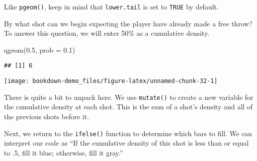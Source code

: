 \documentclass[
]{book}
\newenvironment{Shaded}{\begin{snugshade}}{\end{snugshade}}
\newcommand{\AttributeTok}[1]{\textcolor[rgb]{0.77,0.63,0.00}{#1}}
\newcommand{\DecValTok}[1]{\textcolor[rgb]{0.00,0.00,0.81}{#1}}
\newcommand{\FloatTok}[1]{\textcolor[rgb]{0.00,0.00,0.81}{#1}}
\newcommand{\FunctionTok}[1]{\textcolor[rgb]{0.00,0.00,0.00}{#1}}
\newcommand{\NormalTok}[1]{#1}
\newcommand{\OtherTok}[1]{\textcolor[rgb]{0.56,0.35,0.01}{#1}}
\newcommand{\SpecialCharTok}[1]{\textcolor[rgb]{0.00,0.00,0.00}{#1}}
\newcommand{\StringTok}[1]{\textcolor[rgb]{0.31,0.60,0.02}{#1}}
\begin{document}
Like \texttt{pgeom()}, keep in mind that \texttt{lower.tail} is set to \texttt{TRUE} by default.

By what shot can we begin expecting the player have already made a free throw? To answer this question, we will enter 50\% as a cumulative density.

\begin{Shaded}
\begin{Highlighting}[]
\FunctionTok{qgeom}\NormalTok{(}\FloatTok{0.5}\NormalTok{, }\AttributeTok{prob =} \FloatTok{0.1}\NormalTok{)}
\end{Highlighting}
\end{Shaded}

\begin{verbatim}
## [1] 6
\end{verbatim}

\begin{Shaded}
\end{Shaded}

\begin{center}\texttt{[image: bookdown-demo\_files/figure-latex/unnamed-chunk-32-1]} \end{center}

There is quite a bit to unpack here. We use \texttt{mutate()} to create a new variable for the cumulative density at each shot. This is the sum of a shot's density and all of the previous shots before it.

Next, we return to the \texttt{ifelse()} function to determine which bars to fill. We can interpret our code as ``If the cumulative density of this shot is less than or equal to .5, fill it blue; otherwise, fill it gray.''
\end{document}
